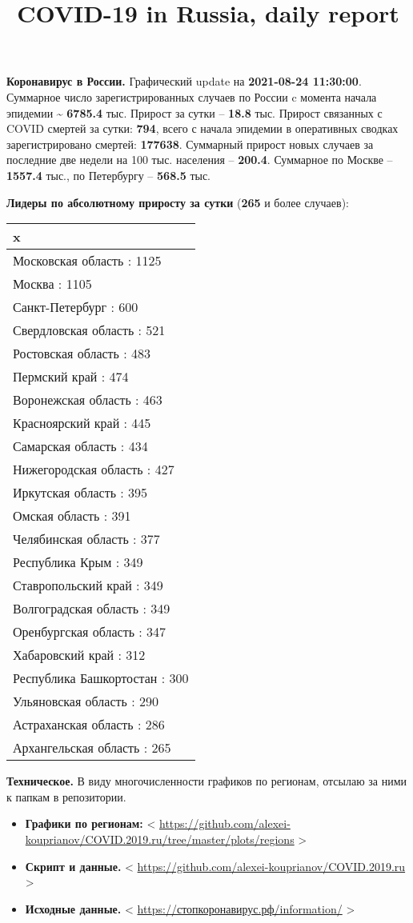 \documentclass[]{article}
\title{COVID-19 in Russia, daily report}
\author{}
\date{\vspace{-2.5em}}
\begin{document}
\maketitle

\textbf{Коронавирус в России.} Графический update на \textbf{2021-08-24
11:30:00}. Суммарное число зарегистрированных случаев по России c
момента начала эпидемии \textasciitilde{} \textbf{6785.4} тыс. Прирост
за сутки -- \textbf{18.8} тыс. Прирост связанных с COVID смертей за
сутки: \textbf{794}, всего с начала эпидемии в оперативных сводках
зарегистрировано смертей: \textbf{177638}. Суммарный прирост новых
случаев за последние две недели на 100 тыс. населения -- \textbf{200.4}.
Суммарное по Москве -- \textbf{1557.4} тыс., по Петербургу --
\textbf{568.5} тыс.

\textbf{Лидеры по абсолютному приросту за сутки} (\textbf{265} и более
случаев):

\begin{longtable}[]{@{}l@{}}
\toprule
x\tabularnewline
\midrule
\endhead
Московская область : 1125\tabularnewline
Москва : 1105\tabularnewline
Санкт-Петербург : 600\tabularnewline
Свердловская область : 521\tabularnewline
Ростовская область : 483\tabularnewline
Пермский край : 474\tabularnewline
Воронежская область : 463\tabularnewline
Красноярский край : 445\tabularnewline
Самарская область : 434\tabularnewline
Нижегородская область : 427\tabularnewline
Иркутская область : 395\tabularnewline
Омская область : 391\tabularnewline
Челябинская область : 377\tabularnewline
Республика Крым : 349\tabularnewline
Ставропольский край : 349\tabularnewline
Волгоградская область : 349\tabularnewline
Оренбургская область : 347\tabularnewline
Хабаровский край : 312\tabularnewline
Республика Башкортостан : 300\tabularnewline
Ульяновская область : 290\tabularnewline
Астраханская область : 286\tabularnewline
Архангельская область : 265\tabularnewline
\bottomrule
\end{longtable}

\textbf{Техническое.} В виду многочисленности графиков по регионам,
отсылаю за ними к папкам в репозитории.

\begin{itemize}
\item
  \textbf{Графики по регионам:} \textless{}
  \url{https://github.com/alexei-kouprianov/COVID.2019.ru/tree/master/plots/regions}
  \textgreater{}
\item
  \textbf{Скрипт и данные.} \textless{}
  \url{https://github.com/alexei-kouprianov/COVID.2019.ru}
  \textgreater{}
\item
  \textbf{Исходные данные.} \textless{}
  \url{https://стопкоронавирус.рф/information/} \textgreater{}
\end{itemize}
\end{document}
